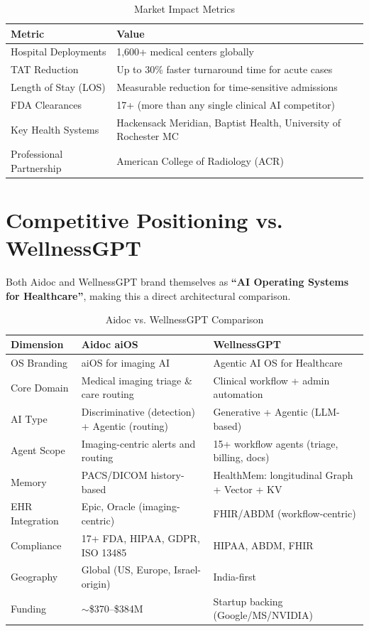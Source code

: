 \documentclass[12pt,a4paper]{article}
\begin{document}
\begin{table}[H]\centering\renewcommand{\arraystretch}{1.4}
\begin{tabularx}{\textwidth}{lX}\toprule
\textbf{Metric} & \textbf{Value}\\\midrule
Hospital Deployments    & 1,600+ medical centers globally \\
TAT Reduction           & Up to 30\% faster turnaround time for acute cases \\
Length of Stay (LOS)    & Measurable reduction for time-sensitive admissions \\
FDA Clearances          & 17+ (more than any single clinical AI competitor) \\
Key Health Systems      & Hackensack Meridian, Baptist Health, University of Rochester MC \\
Professional Partnership & American College of Radiology (ACR) \\
\bottomrule\end{tabularx}\caption{Market Impact Metrics}\end{table}

\section{Competitive Positioning vs. WellnessGPT}

Both Aidoc and WellnessGPT brand themselves as \textbf{``AI Operating Systems for Healthcare''}, making this a direct architectural comparison.

\begin{table}[H]\centering\renewcommand{\arraystretch}{1.5}
\begin{tabularx}{\textwidth}{lXX}\toprule
\textbf{Dimension} & \textbf{Aidoc aiOS} & \textbf{WellnessGPT}\\\midrule
OS Branding      & aiOS\texttrademark{} for imaging AI & Agentic AI OS for Healthcare \\
Core Domain      & Medical imaging triage \& care routing & Clinical workflow + admin automation \\
AI Type          & Discriminative (detection) + Agentic (routing) & Generative + Agentic (LLM-based) \\
Agent Scope      & Imaging-centric alerts and routing & 15+ workflow agents (triage, billing, docs) \\
Memory           & PACS/DICOM history-based             & HealthMem: longitudinal Graph + Vector + KV \\
EHR Integration  & Epic, Oracle (imaging-centric)       & FHIR/ABDM (workflow-centric) \\
Compliance       & 17+ FDA, HIPAA, GDPR, ISO 13485      & HIPAA, ABDM, FHIR \\
Geography        & Global (US, Europe, Israel-origin)   & India-first \\
Funding          & $\sim$\$370--\$384M                  & Startup backing (Google/MS/NVIDIA) \\
\bottomrule\end{tabularx}\caption{Aidoc vs. WellnessGPT Comparison}\end{table}
\end{document}
